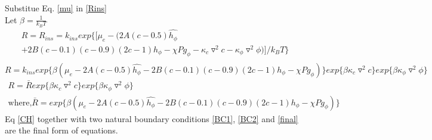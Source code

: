 \documentclass{article}
\begin{document}
Substitue Eq. \eqref{mu} in \eqref{Rins}\\
Let $\beta = \frac{1}{ k_B T}$
\begin{equation}
\begin{multlined}
R = R_{ins} = k_{ins}exp \Big \{ \Big [ \mu_e - \Big( 2A(c-0.5)\hat{h_\phi} \\
    + 2B(c-0.1)(c-0.9)(2c-1) h_\phi -\chi P g_\phi - \kappa_c \triangledown^2 c - \kappa_{\phi} \triangledown^2 \phi \Big) \Big ]/  k_B T \Big \} \nonumber \\
    \end{multlined}
\end{equation}
\begin{equation}
R = k_{ins}exp\Big \{ \beta ( \mu_e - 2A(c-0.5)\hat{h_\phi} -2B(c-0.1)(c-0.9)(2c-1)h_\phi - \chi P g_\phi ) \Big \} exp\Big \{ \beta \kappa_c \triangledown^2c \Big\} exp\Big \{ \beta \kappa_{\phi} \triangledown^2 \phi \Big\} \nonumber
\end{equation}
\begin{gather}\label{final}
R = \bar{R} exp\Big \{ \beta \kappa_c \triangledown^2c \Big\} exp\Big \{ \beta \kappa_{\phi} \triangledown^2 \phi \Big\} \\
\text{where,} \bar{R} = exp\Big \{ \beta ( \mu_e - 2A(c-0.5)\hat{h_\phi} -2B(c-0.1)(c-0.9)(2c-1)h_\phi - \chi P g_\phi ) \Big \} \nonumber 
\end{gather}
Eq \eqref{CH} together with two natural boundary conditions \eqref{BC1}, \eqref{BC2} and \eqref{final} are the final form of equations. 
\end{document}

